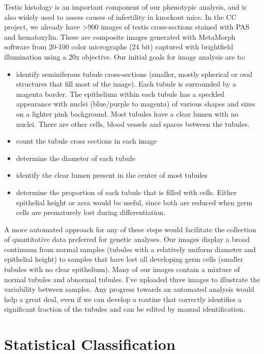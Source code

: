 \documentclass{InsightArticle}
\begin{document}
Testis histology is an important component of our phenotypic analysis, and is
also widely used to assess causes of infertility in knockout mice.  In the CC
project, we already have >900 images of testis cross-sections stained with PAS
and hematoxylin.  These are composite images generated with MetaMorph software
from 20-100 color micrographs (24 bit) captured with brightfield illumination
using a 20x objective. Our initial goals for image analysis are to:

\begin{itemize}
\item identify seminiferous tubule cross-sections (smaller, mostly spherical or
oval structures that fill most of the image).  Each tubule is surrounded by a
magenta border. The epithelium within each tubule has a speckled appearance
with nuclei (blue/purple to magenta) of various shapes and sizes on a lighter
pink background.  Most tubules have a clear lumen with no nuclei.  There are
other cells, blood vessels and spaces between the tubules.
\item count the tubule cross sections in each image
\item determine the diameter of each tubule
\item identify the clear lumen present in the center of most tubules
\item determine the proportion of each tubule that is filled with cells.
Either epithelial height or area would be useful, since both are reduced when
germ cells are prematurely lost during differentiation.
\end{itemize}

A more automated approach for any of these steps would facilitate the
collection of quantitative data preferred for genetic analyses.  Our images
display a broad continuum from normal samples (tubules with a relatively
uniform diameter and epithelial height) to samples that have lost all
developing germ cells (smaller tubules with no clear epithelium).  Many of our
images contain a mixture of normal tubules and abnormal tubules.  I’ve uploaded
three images to illustrate the variability between samples. Any progress
towards an automated analysis would help a great deal, even if we can develop a
routine that correctly identifies a significant fraction of the tubules and can
be edited by manual identification.


\section{Statistical Classification}
\end{document}

